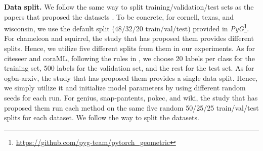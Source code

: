 \smallskip\noindent\textbf{Data split. }
We follow the same way to split training/validation/test sets as the papers that proposed the datasets \cite{hu2020ogb,lim2021large,platonov2023a}.
To be concrete, for cornell, texas, and wisconsin, we use the default split (48/32/20 train/val/test) provided in \textit{PyG}\footnote{\url{https://github.com/pyg-team/pytorch_geometric}}. 
For chameleon and squirrel, the study \cite{platonov2023a} that has proposed them provides  different splits. Hence, we utilize five different splits from them in our experiments. 
As for citeseer and coraML, following the rules in \cite{zhang2021magnet}, we choose 20 labels per class for the training set, 500 labels for the validation set, and the rest for the test set. 
As for ogbn-arxiv, the study \cite{hu2020ogb} that has proposed them provides a single data split. 
Hence, we simply utilize it and initialize model parameters by using different random seeds for each run. 
For genius, snap-pantents, pokec, and wiki, the study \cite{lim2021large} that has proposed them  run each method on the same five random 50/25/25 train/val/test splits for each dataset. 
We follow the way to split the datasets. 

